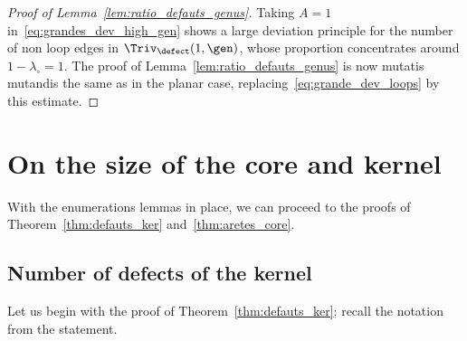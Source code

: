 \begin{proof}[Proof of Lemma~\ref{lem:ratio_defauts_genus}]
Taking $A = 1$ in~\eqref{eq:grandes_dev_high_gen} shows a large deviation principle for the number of non loop edges in $\Triv_{\defect}(1, \gen)$, whose proportion concentrates around $1-\lambda_\circ = 1$.
The proof of Lemma~\ref{lem:ratio_defauts_genus} is now mutatis mutandis the same as in the planar case, replacing~\eqref{eq:grande_dev_loops} by this estimate.
\end{proof}

\section{On the size of the core and kernel}
\label{sec:preuve_core_kernel}

With the enumerations lemmas in place, we can proceed to the proofs of Theorem~\ref{thm:defauts_ker} and~\ref{thm:aretes_core}.

\subsection{Number of defects of the kernel}
\label{ssec:defauts_kernel}

Let us begin with the proof of Theorem~\ref{thm:defauts_ker}; recall the notation from the statement.

